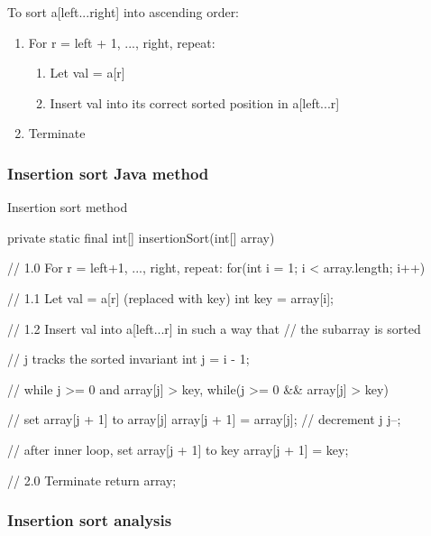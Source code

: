 To sort a[left...right] into ascending order:

\begin{enumerate}
\item For r = left + 1, ..., right, repeat:
	\begin{enumerate}
	\item Let val = a[r]
	\item Insert val into its correct sorted position in a[left...r]
	\end{enumerate}
\item Terminate
\end{enumerate}

\citep[p. 1]{Watt2001}


\subsubsection{Insertion sort Java method}

\begin{listing}[H]
\caption{Insertion sort method}
\begin{javacode}
private static final int[] insertionSort(int[] array) {

    // 1.0 For r = left+1, ..., right, repeat:
    for(int i = 1; i < array.length; i++) {

        // 1.1 Let val = a[r] (replaced with key)
        int key = array[i];

        // 1.2 Insert val into a[left...r] in such a way that 
        // the subarray is sorted

        // j tracks the sorted invariant
        int j = i - 1;

        // while j >= 0 and array[j] > key,
        while(j >= 0 && array[j] > key) {

            // set array[j + 1] to array[j]
            array[j + 1] = array[j];
            // decrement j
            j--;
        }

        // after inner loop, set array[j + 1] to key
        array[j + 1] = key;
    }

    // 2.0 Terminate
    return array;
}
\end{javacode}
\end{listing}

\subsubsection{Insertion sort analysis}
